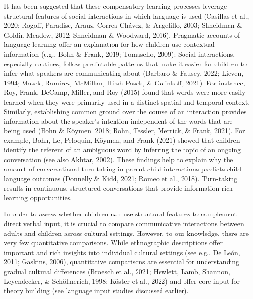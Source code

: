 \documentclass[
  man,floatsintext]{apa6}
\begin{document}
It has been suggested that these compensatory learning processes leverage structural features of social interactions in which language is used (Casillas et al., 2020; Rogoff, Paradise, Arauz, Correa-Chávez, \& Angelillo, 2003; Shneidman \& Goldin-Meadow, 2012; Shneidman \& Woodward, 2016). Pragmatic accounts of language learning offer an explanation for how children use contextual information (e.g., Bohn \& Frank, 2019; Tomasello, 2009): Social interactions, especially routines, follow predictable patterns that make it easier for children to infer what speakers are communicating about (Barbaro \& Fausey, 2022; Lieven, 1994; Masek, Ramirez, McMillan, Hirsh-Pasek, \& Golinkoff, 2021). For instance, Roy, Frank, DeCamp, Miller, and Roy (2015) found that words were more easily learned when they were primarily used in a distinct spatial and temporal context. Similarly, establishing common ground over the course of an interaction provides information about the speaker's intention independent of the words that are being used (Bohn \& Köymen, 2018; Bohn, Tessler, Merrick, \& Frank, 2021). For example, Bohn, Le, Peloquin, Köymen, and Frank (2021) showed that children identify the referent of an ambiguous word by inferring the topic of an ongoing conversation (see also Akhtar, 2002). These findings help to explain why the amount of conversational turn-taking in parent-child interactions predicts child language outcomes (Donnelly \& Kidd, 2021; Romeo et al., 2018). Turn-taking results in continuous, structured conversations that provide information-rich learning opportunities.

In order to assess whether children can use structural features to complement direct verbal input, it is crucial to compare communicative interactions between adults and children across cultural settings. However, to our knowledge, there are very few quantitative comparisons. While ethnographic descriptions offer important and rich insights into individual cultural settings (see e.g., De León, 2011; Gaskins, 2006), quantitative comparisons are essential for understanding gradual cultural differences (Broesch et al., 2021; Hewlett, Lamb, Shannon, Leyendecker, \& Schölmerich, 1998; Köster et al., 2022) and offer core input for theory building (see language input studies discussed earlier).
\end{document}

